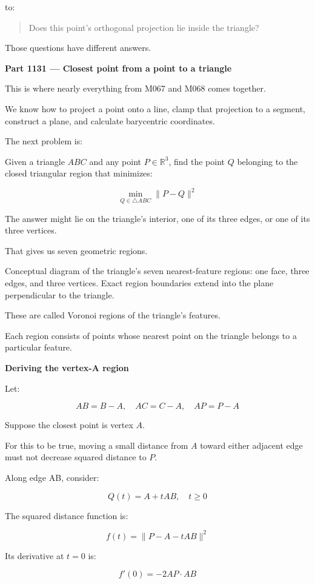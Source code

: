 to:

\begin{quote}
Does this point's orthogonal projection lie inside the triangle?
\end{quote}

Those questions have different answers.

\textbf{Part 1131 --- Closest point from a point to a triangle}

This is where nearly everything from M067 and M068 comes together.

We know how to project a point onto a line, clamp that projection to a segment, construct a plane, and calculate barycentric coordinates.

The next problem is:

Given a triangle \(ABC\) and any point \(P\in\mathbb R^3\), find the point \(Q\) belonging to the closed triangular region that minimizes:

\[
\boxed{ \min_{Q\in\triangle ABC}\|P-Q\|^2 }
\]

The answer might lie on the triangle's interior, one of its three edges, or one of its three vertices.

That gives us seven geometric regions.

Conceptual diagram of the triangle's seven nearest-feature regions: one face, three edges, and three vertices. Exact region boundaries extend into the plane perpendicular to the triangle.

These are called Voronoi regions of the triangle's features.

Each region consists of points whose nearest point on the triangle belongs to a particular feature.

\textbf{Deriving the vertex-A region}

Let:

\[
AB=B-A,\quad AC=C-A,\quad AP=P-A
\]

Suppose the closest point is vertex \(A\).

For this to be true, moving a small distance from \(A\) toward either adjacent edge must not decrease squared distance to \(P\).

Along edge AB, consider:

\[
Q(t)=A+tAB,\quad t\ge0
\]

The squared distance function is:

\[
f(t)=\|P-A-tAB\|^2
\]

Its derivative at \(t=0\) is:

\[
f'(0)=-2AP\cdot AB
\]

